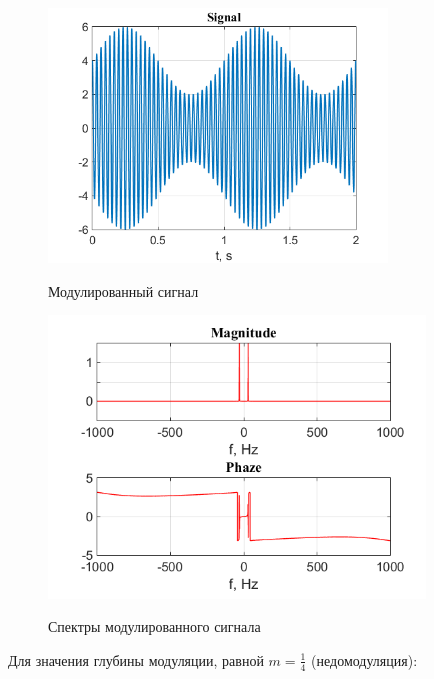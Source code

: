 \documentclass[a4paper,14pt]{article}
\begin{document}
\begin{figure}[h]
\begin{multicols}{1}
\hfill
\includegraphics[width=90mm]{am1_2}
\hfill
\caption{Модулированный сигнал}
\label{figBottom}
\hfill
\includegraphics[width=100mm]{am1_2_spec}
\hfill
\caption{Спектры модулированного сигнала}
\label{figDown}
\end{multicols}
\end{figure}
Для значения глубины модуляции, равной $ m = \frac{1}{4} $ (недомодуляция):
\end{document}
